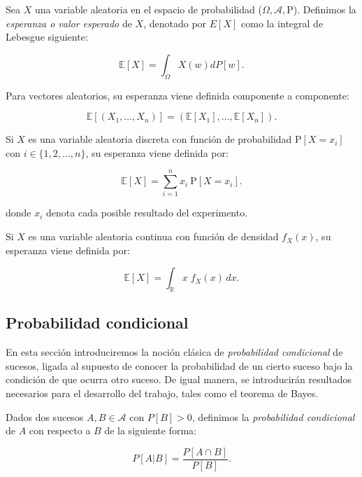 \begin{definicion}\label{def:esperanza-variable-aleatoria}
Sea $X$ una variable aleatoria en el espacio de probabilidad ($\Omega, \mathcal{A}, \mathrm{P}$). Definimos la \emph{esperanza o valor esperado} de $X$, denotado por $E[X]$ como la integral de Lebesgue siguiente:

\[ \mathbb{E}[X] = \int_{\Omega} X(w)dP[w]. \]

Para vectores aleatorios, su esperanza viene definida componente a componente:

\[ \mathbb{E}[(X_1, \ldots, X_n)] = (\mathbb{E}[X_1], \ldots, \mathbb{E}[X_n]). \]
\end{definicion}

\begin{observacion}
    Si $X$ es una variable aleatoria discreta con función de probabilidad $\mathrm{P}[X = x_i]$ con $i \in \{1,2,\ldots,n\}$, su esperanza viene definida por:

    \[ \mathbb{E}[X] = \sum_{i=1}^{n} x_i \: \mathrm{P}[X = x_i]. \]

    donde $x_i$ denota cada posible resultado del experimento.
\end{observacion}

\begin{observacion}
    Si $X$ es una variable aleatoria continua con función de densidad $f_X(x)$, su esperanza viene definida por:

    \[ \mathbb{E}[X] =  \int_{\mathbb{R}} x \;f_X(x) \, dx. \]
\end{observacion}

\subsection{Probabilidad condicional}

En esta sección introduciremos la noción clásica de \emph{probabilidad condicional} de sucesos, ligada al supuesto de conocer la probabilidad de un cierto suceso bajo la condición de que ocurra otro suceso. De igual manera, se introducirán resultados necesarios para el desarrollo del trabajo, tales como el teorema de Bayes.

\begin{definicion}\label{def:probabilidad-condicional}
    Dados dos sucesos $A, B \in \mathcal{A}$ con $P[B] > 0$, definimos la \emph{probabilidad condicional} de $A$ con respecto a $B$ de la siguiente forma:

    \[ P[A|B] = \frac{P[A \cap B]}{P[B]}. \]
\end{definicion}

